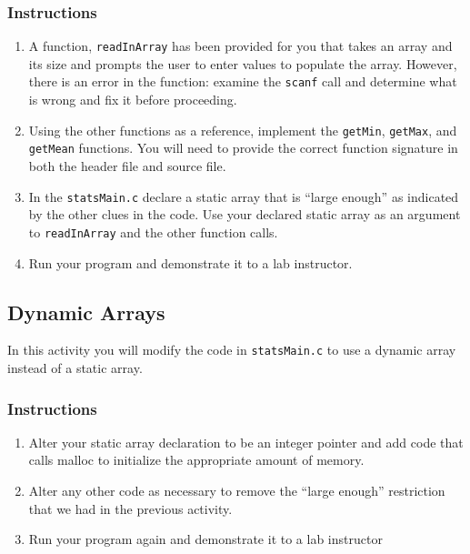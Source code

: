 \documentclass[12pt]{scrartcl}
\begin{document}
\subsubsection*{Instructions}

\begin{enumerate}
  \item A function, \texttt{readInArray} has been provided for you
	that takes an array and its size and prompts the user to enter values
	to populate the array.  However, there is an error in the function:
	examine the \texttt{scanf} call and determine what is wrong
	and fix it before proceeding.
  \item Using the other functions as a reference, implement the
	\texttt{getMin}, \texttt{getMax}, and \texttt{getMean}
	functions.  You will need to provide the correct function signature
	in both the header file and source file.
  \item In the \texttt{statsMain.c} declare a static array that is
	``large enough'' as indicated by the other clues in the code.  Use your
	declared static array as an argument to \texttt{readInArray}
	and the other function calls.
  \item Run your program and demonstrate it to a lab instructor.
\end{enumerate}

\subsection{Dynamic Arrays}

In this activity you will modify the code in \texttt{statsMain.c} to
use a dynamic array instead of a static array.

\subsubsection*{Instructions}

\begin{enumerate}
  \item Alter your static array declaration to be an integer pointer and add
	code that calls malloc to initialize the appropriate amount of memory.
  \item Alter any other code as necessary to remove the ``large enough''
	restriction that we had in the previous activity.
  \item Run your program again and demonstrate it to a lab instructor
\end{enumerate}
\end{document}
